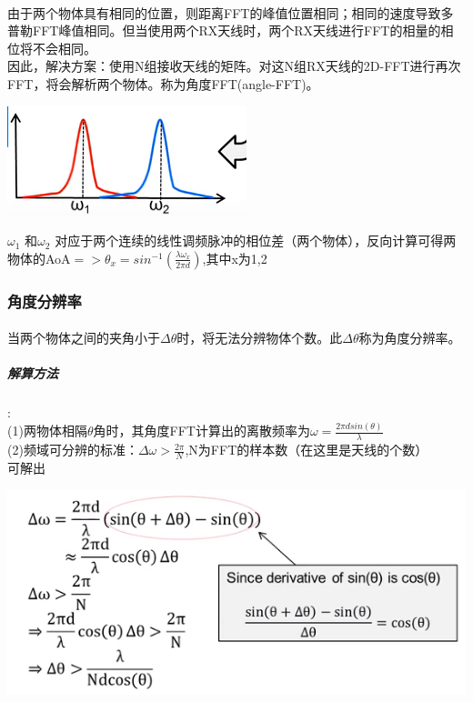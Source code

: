 \documentclass[UTF8]{ctexart}
\begin{document}
\paragraph{}
由于两个物体具有相同的位置，则距离FFT的峰值位置相同；相同的速度导致多普勒FFT峰值相同。但当使用两个RX天线时，两个RX天线进行FFT的相量的相位将不会相同。\\
因此，解决方案：使用N组接收天线的矩阵。对这N组RX天线的2D-FFT进行再次FFT，将会解析两个物体。称为角度FFT(angle-FFT)。

{\centering \includegraphics[width = .3\textwidth]{pic/angleFFT.png}

}

$\omega_1$ 和$\omega_2$ 对应于两个连续的线性调频脉冲的相位差（两个物体），反向计算可得两物体的AoA$=> \theta_x=sin^{-1}(\frac{\lambda \omega_x}{2\pi d})$,其中x为1,2

\subsubsection{角度分辨率}
\paragraph{}
当两个物体之间的夹角小于$\Delta \theta$时，将无法分辨物体个数。此$\Delta \theta$称为角度分辨率。
\subparagraph{解算方法}:\\
(1)两物体相隔$\theta$角时，其角度FFT计算出的离散频率为$\omega=\frac{2\pi d sin(\theta)}{\lambda}$\\
(2)频域可分辨的标准：$\Delta \omega > \frac{2\pi}{N}$,N为FFT的样本数（在这里是天线的个数）\\
可解出

{\centering \includegraphics[width = .7\textwidth]{pic/result.png}

}
\end{document}
